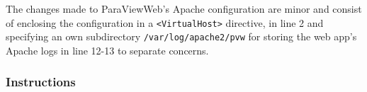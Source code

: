 

The changes made to ParaViewWeb's Apache configuration are minor and consist of
enclosing the configuration in a \lstinline{<VirtualHost>} directive,  in line 2
and specifying an own subdirectory \lstinline{/var/log/apache2/pvw} for storing
the web app's Apache logs in line 12-13 to separate concerns.



\subsubsection*{Instructions}


